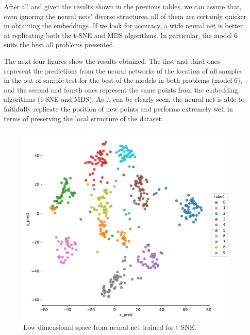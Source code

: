 \documentclass[a4paper,11pt,spanish]{report}
\begin{document}
After all and given the results shown in the previous tables, we can assure that, even ignoring the neural nets' diverse structures, all of them are certainly quicker in obtaining the embeddings. If we look for accuracy, a wide neural net is better at replicating both the t-SNE and MDS algorithms. In particular, the model 6 suits the best all problems presented.

The next four figures show the results obtained. The first and third ones represent the predictions from the neural networks of the location of all samples in the out-of-sample test for the best of the models in both problems (model 6), and the second and fourth ones represent the same points from the embedding algorithms (t-SNE and MDS). As it can be clearly seen, the neural net is able to faithfully replicate the position of new points and performs extremely well in terms of preserving the local structure of the dataset.

\begin{figure}[p]
\centering
\includegraphics[width=12cm]{figures/app1plotpredictions.pdf}
\caption{\label{figureNN}Low dimensional space from neural net trained for t-SNE.}
\end{figure}
\end{document}
